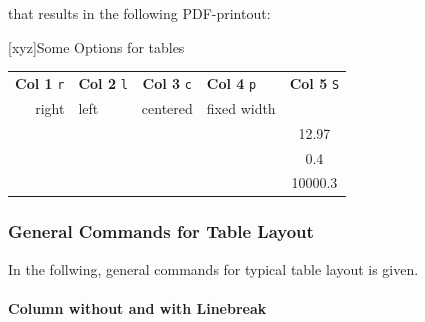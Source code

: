 \documentclass{pharmrep}
\begin{document}
that results in the following PDF-printout:

\begin{minipage}{\linewidth}
   [xyz]{Some Options for tables}\label{tab:TabGenLayout}
   \begin{tabular}{rlcp{10mm}S}\toprule
      \textbf{Col 1} \texttt{r} & \textbf{ Col 2} \texttt{l} & \textbf{Col 3} \texttt{c} & \textbf{Col 4}
      \texttt{p} & \textbf{ Col 5} \texttt{S} \\ \cmidrule(lr){1-4}
      right & left & centered & fixed width &  \\ \midrule
      & & & & 12.97 \\
      & & & & 0.4 \\
      & & & & 10000.3 \\ \bottomrule
   \end{tabular}%
\end{minipage}

\bigskip

\subsubsection{General Commands for Table Layout}
In the follwing, general commands for typical table layout is given.

\paragraph{Column without and with Linebreak}
\end{document}
